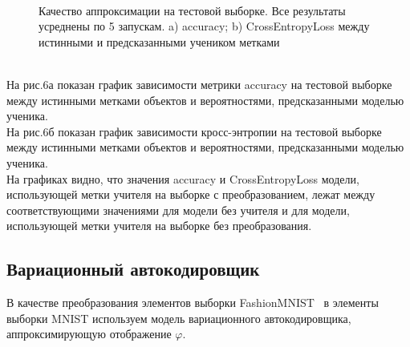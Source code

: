 \begin{figure}[h!t]\center
{}
\\
\caption{Качество аппроксимации на тестовой выборке. Все результаты усреднены по 5 запускам. a) accuracy; b) CrossEntropyLoss между истинными и предсказанными учеником метками}
\end{figure}\\
На рис.6а показан график зависимости метрики accuracy на тестовой выборке между истинными метками объектов и вероятностями, предсказанными моделью ученика.\\
На рис.6б показан график зависимости кросс-энтропии на тестовой выборке между истинными метками объектов и вероятностями, предсказанными моделью ученика.\\
На графиках видно, что значения accuracy и CrossEntropyLoss модели, использующей метки учителя на выборке с преобразованием, лежат между соответствующими значениями для модели без учителя и для модели, использующей метки учителя на выборке без преобразования.

\subsection{Вариационный автокодировщик}
В качестве преобразования элементов выборки FashionMNIST~\cite{FMNIST} в элементы выборки MNIST используем модель вариационного автокодировщика, аппроксимирующую отображение $\varphi$.
